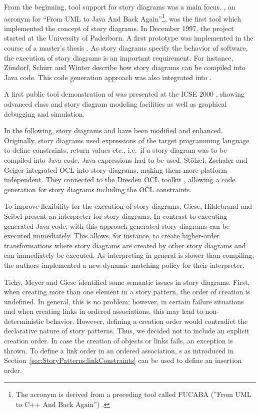 From the beginning, tool support for story diagrams was a main focus.
\fuj, an acronym for ``From UML to Java And Back Again''\footnote{The acronym is derived from a preceding tool called FUCABA (''From UML to C++ And Back Again'') \cite{JZ97}.}, was the first tool which implemented the concept of story diagrams.
In December 1997, the project started at the University of Paderborn.
A first prototype was implemented in the course of a master's thesis \cite{FNT98}.
As story diagrams specify the behavior of software, the execution of story diagrams is an important requirement.
For instance, Z\"{u}ndorf, Sch\"{u}rr and Winter \cite{ZSW99} describe how story diagrams can be compiled into Java code.
This code generation approach was also integrated into \fuj.

A first public tool demonstration of \fuj was presented at the ICSE 2000 \cite{NNZ00}, showing advanced class and story diagram modeling facilities as well as graphical debugging and simulation.

In the following, story diagrams and \fuj have been modified and enhanced.
Originally, story diagrams used expressions of the target programming language to define constraints, return values etc.,
i.e.\ if a story diagram was to be compiled into Java code, Java expressions had to be used.
St\"{o}lzel, Zschaler and Geiger \cite{SZG07} integrated OCL into story diagrams, making them more platform-independent.
They connected \fuj to the Dresden OCL toolkit \cite{DresdenOCL}, allowing a code generation for story diagrams including the OCL constraints.

To improve flexibility for the execution of story diagrams, Giese, Hildebrand and Seibel \cite{GHS09} present an interpreter for story diagrams.
In contrast to executing generated Java code, with this approach generated story diagrams can be executed immediately.
This allows, for instance, to create higher-order transformations where story diagrams are created by other story diagrams and can immediately be executed.
As interpreting in general is slower than compiling, the authors implemented a new dynamic matching policy for their interpreter.

Tichy, Meyer and Giese \cite{TMG06} identified some semantic issues in story diagrams.
First, when creating more than one element in a story pattern, the order of creation is undefined.
In general, this is no problem; however, in certain failure situations and when creating links in ordered associations, this may lead to non-deterministic behavior.
However, defining a creation order would contradict the declarative nature of story patterns.
Thus, we decided not to include an explicit creation order.
In case the creation of objects or links fails, an exception is thrown.
To define a link order in an ordered association, s as introduced in Section~\ref{sec:StoryPatterns:linkConstraints} can be used to define an insertion order.

